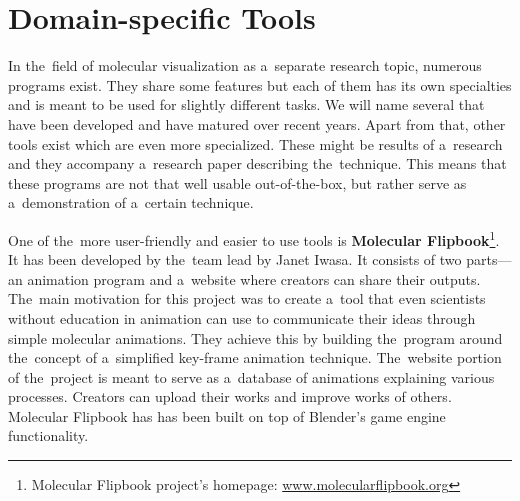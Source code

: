 \documentclass[
  digital, %
  table,   %
  nolof,     %
  nolot,     %
  oneside,
]{fithesis3}
\begin{document}


\section{Domain-specific Tools}
In the field of molecular visualization as a separate research topic, numerous programs exist. They share some features but each of them has its own specialties and is meant to be used for slightly different tasks. We will name several that have been developed and have matured over recent years. Apart from that, other tools exist which are even more specialized. These might be results of a research and they accompany a research paper describing the technique. This means that these programs are not that well usable out-of-the-box, but rather serve as a demonstration of a certain technique.

One of the more user-friendly and easier to use tools is \textbf{Molecular Flipbook}\footnote{Molecular Flipbook project's homepage: \url{www.molecularflipbook.org}}. It has been developed by the team lead by Janet Iwasa. It consists of two parts—an animation program and a website where creators can share their outputs. The main motivation for this project was to create a tool that even scientists without education in animation can use to communicate their ideas through simple molecular animations. They achieve this by building the program around the concept of a simplified key-frame animation technique. The website portion of the project is meant to serve as a database of animations explaining various processes. Creators can upload their works and improve works of others. Molecular Flipbook has has been built on top of Blender's game engine functionality.
\end{document}
